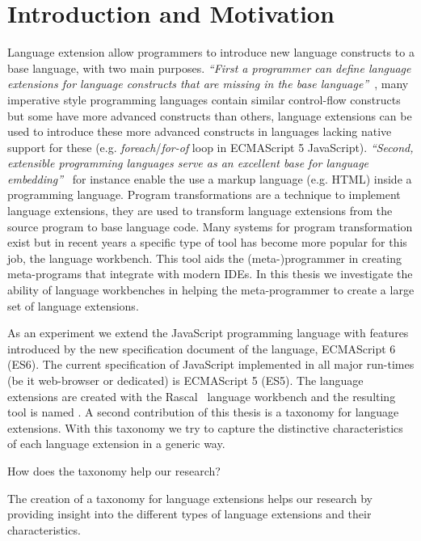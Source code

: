 
\chapter{Introduction and Motivation}

\label{Chapter1}


Language extension allow programmers to introduce new language constructs to a base language, with two main purposes. \textit{``First a programmer can define language extensions for language constructs that are missing in the base language''}~\cite{Erdweg2014a}, many imperative style programming languages contain similar control-flow constructs but some have more advanced constructs than others, language extensions can be used to introduce these more advanced constructs in languages lacking native support for these (e.g. \textit{foreach}/\textit{for-of} loop in ECMAScript 5 JavaScript). \textit{``Second, extensible programming languages serve as an excellent base for language embedding''}~\cite{Erdweg2014a} for instance enable the use a markup language (e.g. HTML) inside a programming language. Program transformations are a technique to implement language extensions, they are used to transform language extensions from the source program to base language code. Many systems for program transformation exist but in recent years a specific type of tool has become more popular for this job, the language workbench. This tool aids the (meta-)programmer in creating meta-programs that integrate with modern IDEs. In this thesis we investigate the ability of language workbenches in helping the meta-programmer to create a large set of language extensions. 

As an experiment we extend the JavaScript programming language with features introduced by the new specification document of the language, ECMAScript 6 (ES6). The current specification of JavaScript implemented in all major run-times (be it web-browser or dedicated) is ECMAScript 5 (ES5). The language extensions are created with the Rascal~\cite{Klint} language workbench and the resulting tool is named \projectname. A second contribution of this thesis is a taxonomy for language extensions. With this taxonomy we try to capture the distinctive characteristics of each language extension in a generic way.

How does the taxonomy help our research?

The creation of a taxonomy for language extensions helps our research by providing insight into the different types of language extensions and their characteristics.

